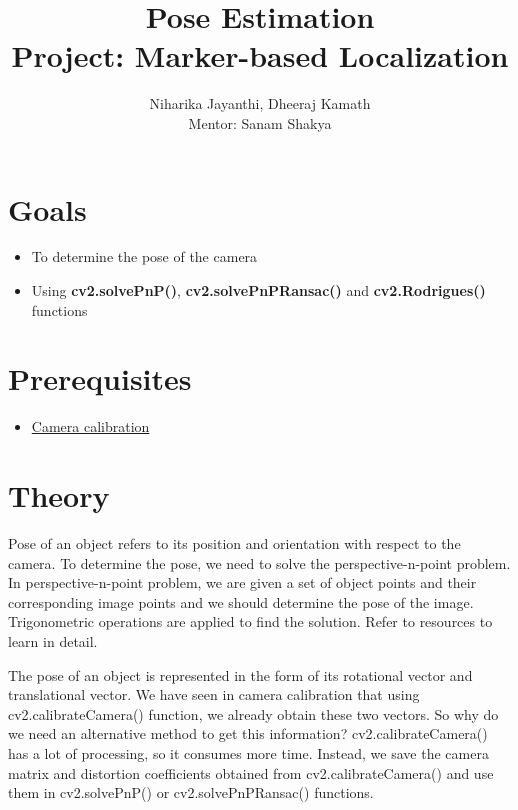 \documentclass[]{article}
\date{}
\providecommand{\tightlist}{%
  \setlength{\itemsep}{0pt}\setlength{\parskip}{0pt}}
\begin{document}
	\title{\huge\textbf{Pose Estimation}\LARGE \\Project: Marker-based Localization}
	\author{Niharika Jayanthi, Dheeraj Kamath \\Mentor: Sanam Shakya}
	\maketitle
	\pagebreak
\section{Goals}\label{goals}

\begin{itemize}
\tightlist
\item
  To determine the pose of the camera
\item
  Using \textbf{cv2.solvePnP()}, \textbf{cv2.solvePnPRansac()} and
  \textbf{cv2.Rodrigues()} functions
\end{itemize}

\section{Prerequisites}\label{prerequisites}

\begin{itemize}
\tightlist
\item
  \href{https://github.com/eyantrainternship/eYSIP_2015_Marker_based_Robot_Localisation/wiki/Camera-Calibration}{Camera
  calibration}
\end{itemize}

\section{Theory}\label{theory}

Pose of an object refers to its position and orientation with respect to
the camera. To determine the pose, we need to solve the
perspective-n-point problem. In perspective-n-point problem, we are
given a set of object points and their corresponding image points and we
should determine the pose of the image. Trigonometric operations are
applied to find the solution. Refer to resources to learn in detail.

The pose of an object is represented in the form of its rotational
vector and translational vector. We have seen in camera calibration that
using cv2.calibrateCamera() function, we already obtain these two
vectors. So why do we need an alternative method to get this
information? cv2.calibrateCamera() has a lot of processing, so it
consumes more time. Instead, we save the camera matrix and distortion
coefficients obtained from cv2.calibrateCamera() and use them in
cv2.solvePnP() or cv2.solvePnPRansac() functions.
\end{document}
